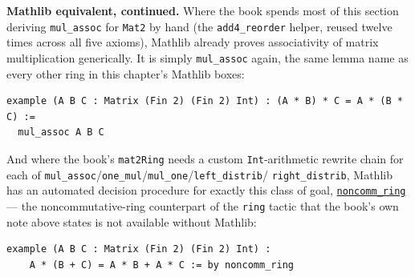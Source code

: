 \textbf{Mathlib equivalent, continued.} Where the book spends most of this section deriving \texttt{mul\_\allowbreak{}assoc} for \texttt{Mat2} by hand (the \texttt{add4\_\allowbreak{}reorder} helper, reused twelve times across all five axioms), Mathlib already proves associativity of matrix multiplication generically. It is simply \texttt{mul\_\allowbreak{}assoc} again, the same lemma name as every other ring in this chapter's Mathlib boxes:

\begin{lstlisting}
example (A B C : Matrix (Fin 2) (Fin 2) Int) : (A * B) * C = A * (B * C) :=
  mul_assoc A B C
\end{lstlisting}

And where the book's \texttt{mat2Ring} needs a custom \texttt{Int}-arithmetic rewrite chain for each of \texttt{mul\_\allowbreak{}assoc}/\texttt{one\_\allowbreak{}mul}/\texttt{mul\_\allowbreak{}one}/\texttt{left\_\allowbreak{}distrib}/ \texttt{right\_\allowbreak{}distrib}, Mathlib has an automated decision procedure for exactly this class of goal, \href{https://lean-lang.org/doc/reference/latest/Tactic-Proofs/Tactic-Reference/}{\texttt{noncomm\_\allowbreak{}ring}} --- the noncommutative-ring counterpart of the \texttt{ring} tactic that the book's own note above states is not available without Mathlib:

\begin{lstlisting}
example (A B C : Matrix (Fin 2) (Fin 2) Int) :
    A * (B + C) = A * B + A * C := by noncomm_ring
\end{lstlisting}
